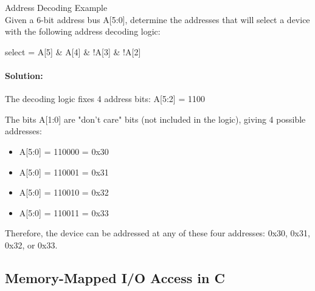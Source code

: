 \begin{example2}{Address Decoding Example}\\
Given a 6-bit address bus A[5:0], determine the addresses that will select a device with the following address decoding logic:
\begin{center}
select = A[5] \& A[4] \& !A[3] \& !A[2]
\end{center}

\tcblower
\paragraph{Solution:}
The decoding logic fixes 4 address bits: A[5:2] = 1100

The bits A[1:0] are "don't care" bits (not included in the logic), giving 4 possible addresses:
\begin{itemize}
    \item A[5:0] = 110000 = 0x30
    \item A[5:0] = 110001 = 0x31
    \item A[5:0] = 110010 = 0x32
    \item A[5:0] = 110011 = 0x33
\end{itemize}

Therefore, the device can be addressed at any of these four addresses: 0x30, 0x31, 0x32, or 0x33.
\end{example2}

\subsection{Memory-Mapped I/O Access in C}


